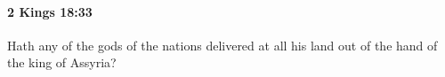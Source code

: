 
		\paragraph{2 Kings 18:33} %
			\label{2KINGS-18-33}

			Hath any of the gods of the nations delivered at all his land out of the hand of the king of Assyria?


